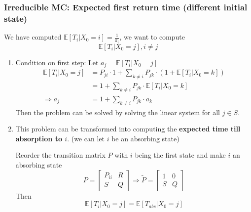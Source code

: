 \documentclass[11pt,a4paper]{article}
\begin{document}
\subsubsection{Irreducible MC: Expected first return time (different initial state)}
We have computed $\mathbb{E}[T_i|X_0=i]=\frac{1}{\pi_i}$, we want to compute $$\mathbb{E}[T_i|X_0=j],i\neq j$$
\begin{enumerate}
    \item Condition on first step: Let $a_j=\mathbb{E}[T_i|X_0=j]$
    \begin{equation}
        \begin{aligned}
            \mathbb{E}[T_i|X_0=j]&=P_{ji}\cdot 1+\sum_{k\neq i}P_{jk}\cdot(1+\mathbb{E}[T_i|X_0=k])\\
            &=1+\sum_{k\neq i}P_{jk}\cdot\mathbb{E}[T_i|X_0=k]\\
            \Rightarrow a_j&=1+\sum_{k\neq i}P_{jk}\cdot a_k
        \end{aligned}
        \nonumber
    \end{equation}
    Then the problem can be solved by solving the linear system for all $j\in S$.
    \item This problem can be transformed into computing the \textbf{expected time till absorption to $i$}. (we can let $i$ be an absorbing state)

    Reorder the transition matrix $P$ with $i$ being the first state and make $i$ an absorbing state $$P=\begin{bmatrix}
        P_{ii}& R\\
        S & Q
    \end{bmatrix} \Rightarrow \tilde{P}=\begin{bmatrix}
        1&0\\
        S&Q
    \end{bmatrix}$$
    Then $$\mathbb{E}[T_i|X_0=j]=\mathbb{E}[T_{abs}|X_0=j]$$
\end{enumerate}
\end{document}
